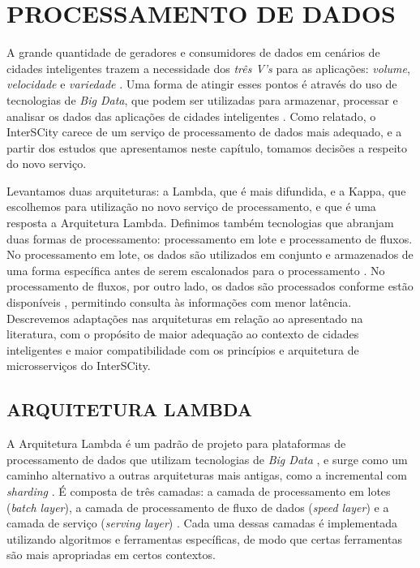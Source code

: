 \chapter[PROCESSAMENTO DE DADOS]{PROCESSAMENTO DE DADOS}
\label{chapter:data}

A grande quantidade de geradores e consumidores de dados em cenários de cidades
inteligentes trazem a necessidade dos \textit{três V's} para as aplicações:
\textit{volume}, \textit{velocidade} e \textit{variedade} \cite{alnuaimi2015}.
Uma forma de atingir esses pontos é através do uso de tecnologias de
\textit{Big Data}, que podem ser utilizadas para armazenar, processar e analisar
os dados das aplicações de cidades inteligentes \cite{alnuaimi2015}. Como
relatado, o InterSCity carece de um serviço de processamento de dados mais
adequado, e a partir dos estudos que apresentamos neste capítulo, tomamos
decisões a respeito do novo serviço.

Levantamos duas arquiteturas: a Lambda, que é mais difundida, e a Kappa,
que escolhemos para utilização no novo serviço de processamento, e que é
uma resposta a Arquitetura Lambda. Definimos também tecnologias que abranjam duas
formas de processamento: processamento em lote e processamento de fluxos.
No processamento em lote, os dados são utilizados
em conjunto e armazenados de uma forma específica antes de serem escalonados
para o processamento \cite{zheng2015real}. No processamento
de fluxos, por outro lado, os dados são processados conforme estão
disponíveis \cite{zheng2015real}, permitindo consulta às informações com menor
latência. Descrevemos adaptações nas arquiteturas em relação ao apresentado
na literatura, com o propósito de maior adequação ao contexto de cidades
inteligentes e maior compatibilidade com os princípios e arquitetura de
microsserviços do InterSCity.

\section{ARQUITETURA LAMBDA}

A Arquitetura Lambda é um padrão de projeto para plataformas de processamento
de dados que utilizam tecnologias de \textit{Big Data} \cite{kiran2015}, e
surge como um caminho alternativo a outras arquiteturas mais antigas, como a
incremental com \textit{sharding} \cite{marz2015}. É composta de três camadas:
a camada de processamento em lotes (\textit{batch layer}), a camada de processamento de
fluxo de dados (\textit{speed layer}) e a camada de serviço (\textit{serving
layer}) \cite{kiran2015}. Cada uma dessas
camadas é implementada utilizando algoritmos e ferramentas específicas, de modo
que certas ferramentas são mais apropriadas em certos contextos.

